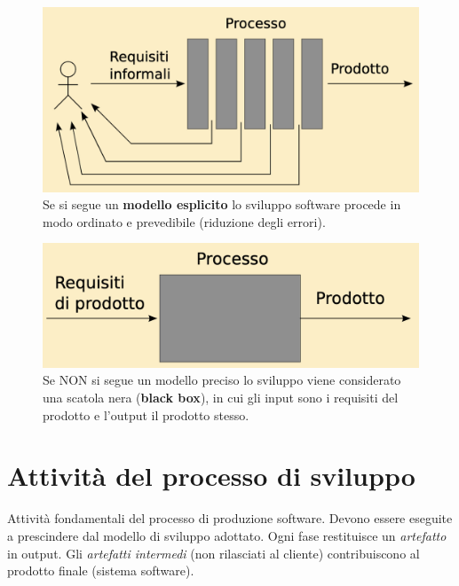 \begin{figure}[ht!]
    \centering
    \includegraphics[width=0.8\linewidth]{assets/processo_esplicito.png}
    \caption{Se si segue un \textbf{modello esplicito} lo sviluppo software procede in modo ordinato e prevedibile (riduzione degli errori).}
\end{figure}

\begin{figure}[ht!]
    \centering
    \includegraphics[width=0.8\linewidth]{assets/processo_blackbox.png}
    \caption{Se NON si segue un modello preciso lo sviluppo viene considerato una scatola nera (\textbf{black box}), in cui gli input sono i requisiti del prodotto e l'output il prodotto stesso.}
\end{figure}

\newpage

\section{Attività del processo di sviluppo}
Attività fondamentali del processo di produzione software. Devono essere eseguite a prescindere dal modello di sviluppo adottato. Ogni fase restituisce un \textit{artefatto} in output. Gli \textit{artefatti intermedi} (non rilasciati al cliente) contribuiscono al prodotto finale (sistema software).

